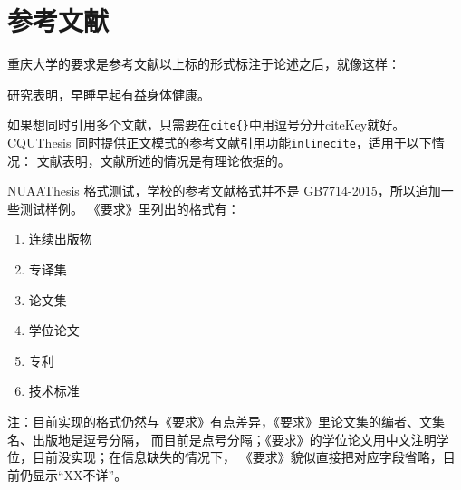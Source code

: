\section{参考文献}
\label{sec:bib}
重庆大学的要求是参考文献以上标的形式标注于论述之后，就像这样：

研究表明\cite{r1}，早睡早起有益身体健康。

如果想同时引用多个文献\cite{r2,r3,r4,r6}，只需要在\verb|cite{}|中用逗号分开\textsf{citeKey}就好。
CQUThesis 同时提供正文模式的参考文献引用功能\texttt{inlinecite}，适用于以下情况：
文献表明，文献所述的情况是有理论依据的。

NUAAThesis 格式测试，学校的参考文献格式并不是 GB7714-2015，所以追加一些测试样例。
《要求》里列出的格式有：
\begin{enumerate}
  \item 连续出版物\cite{n11,n12}
  \item 专译集\cite{n21,n22}
  \item 论文集\cite{n31,n32}
  \item 学位论文\cite{n41,n42,n43}
  \item 专利\cite{n51,n52,n53}
  \item 技术标准\cite{n61,n62,n63}
\end{enumerate}

注：目前实现的格式仍然与《要求》有点差异，《要求》里论文集的编者、文集名、出版地是逗号分隔，
而目前是点号分隔；《要求》的学位论文用中文注明学位，目前没实现；在信息缺失的情况下，
《要求》貌似直接把对应字段省略，目前仍显示“XX不详”。
